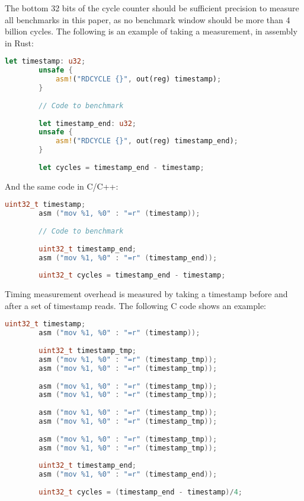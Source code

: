 \documentclass{article}
\begin{document}
The bottom 32 bits of the cycle counter should be sufficient precision to measure all benchmarks in this paper, as no benchmark window should be more than 4 billion cycles. The following is an example of taking a measurement, in assembly in Rust:

\begin{lstlisting}[language=rust]
        let timestamp: u32;
        unsafe {
            asm!("RDCYCLE {}", out(reg) timestamp);
        }
    
        // Code to benchmark
    
        let timestamp_end: u32;
        unsafe {
            asm!("RDCYCLE {}", out(reg) timestamp_end);
        }
    
        let cycles = timestamp_end - timestamp;
\end{lstlisting}

And the same code in C/C++:

\begin{lstlisting}[language=c]
        uint32_t timestamp;
        asm ("mov %1, %0" : "=r" (timestamp));
    
        // Code to benchmark
    
        uint32_t timestamp_end;
        asm ("mov %1, %0" : "=r" (timestamp_end));
    
        uint32_t cycles = timestamp_end - timestamp;
\end{lstlisting}

Timing measurement overhead is measured by taking a timestamp before and after a set of timestamp reads. The following C code shows an example:

\begin{lstlisting}[language=c]
        uint32_t timestamp;
        asm ("mov %1, %0" : "=r" (timestamp));
    
        uint32_t timestamp_tmp;
        asm ("mov %1, %0" : "=r" (timestamp_tmp));
        asm ("mov %1, %0" : "=r" (timestamp_tmp));
        
        asm ("mov %1, %0" : "=r" (timestamp_tmp));
        asm ("mov %1, %0" : "=r" (timestamp_tmp));
        
        asm ("mov %1, %0" : "=r" (timestamp_tmp));
        asm ("mov %1, %0" : "=r" (timestamp_tmp));
        
        asm ("mov %1, %0" : "=r" (timestamp_tmp));
        asm ("mov %1, %0" : "=r" (timestamp_tmp));
    
        uint32_t timestamp_end;
        asm ("mov %1, %0" : "=r" (timestamp_end));
    
        uint32_t cycles = (timestamp_end - timestamp)/4;
\end{lstlisting}
\end{document}
